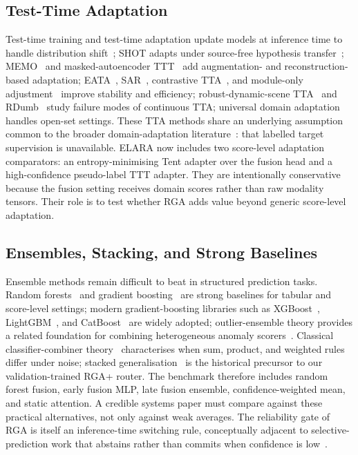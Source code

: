 \documentclass[10pt,conference]{IEEEtran}
\newcommand{\system}{ELARA}
\newcommand{\method}{RGA}
\newcommand{\methodplus}{RGA+}
\begin{document}
\subsection{Test-Time Adaptation}
Test-time training and test-time adaptation update models at inference time
to handle distribution shift~\cite{sun2020testtime,wang2021tent}; SHOT
adapts under source-free hypothesis transfer~\cite{liang2020shot};
MEMO~\cite{zhang2022memo} and masked-autoencoder TTT~\cite{gandelsman2022tta}
add augmentation- and reconstruction-based adaptation;
EATA~\cite{niu2022efficient}, SAR~\cite{yang2023sar}, contrastive
TTA~\cite{chen2022contrastive}, and module-only
adjustment~\cite{iwasawa2021testtime} improve stability and efficiency;
robust-dynamic-scene TTA~\cite{yuan2023robust} and RDumb~\cite{press2023entropy}
study failure modes of continuous TTA; universal domain
adaptation~\cite{saito2020universal} handles open-set settings. These TTA
methods share an underlying assumption common to the broader domain-adaptation
literature~\cite{ganin2015unsupervised,long2015learning,ben2010theory}: that
labelled target supervision is unavailable. \system{} now includes two
score-level adaptation comparators: an entropy-minimising Tent adapter over
the fusion head and a high-confidence pseudo-label TTT adapter. They are
intentionally conservative because the fusion setting receives domain scores
rather than raw modality tensors. Their role is to test whether \method{}
adds value beyond generic score-level adaptation.

\subsection{Ensembles, Stacking, and Strong Baselines}
Ensemble methods remain difficult to beat in structured prediction tasks.
Random forests~\cite{breiman2001random} and gradient
boosting~\cite{friedman2001greedy} are strong baselines for tabular and
score-level settings; modern gradient-boosting libraries such as
XGBoost~\cite{chen2016xgboost}, LightGBM~\cite{ke2017lightgbm}, and
CatBoost~\cite{prokhorenkova2018catboost} are widely adopted; outlier-ensemble
theory provides a related foundation for combining heterogeneous anomaly
scorers~\cite{aggarwal2017outlier}. Classical classifier-combiner
theory~\cite{kittler1998combining} characterises when sum, product, and
weighted rules differ under noise; stacked generalisation~\cite{wolpert1992stacked}
is the historical precursor to our validation-trained \methodplus{} router. The
benchmark therefore includes random forest fusion, early fusion MLP, late
fusion ensemble, confidence-weighted mean, and static attention. A credible
systems paper must compare against these practical alternatives, not only
against weak averages. The reliability gate of \method{} is itself an
inference-time switching rule, conceptually adjacent to selective-prediction
work that abstains rather than commits when confidence is
low~\cite{geifman2017selective,geifman2019selectivenet,corbiere2019addressing,granese2021doctor}.
\end{document}
